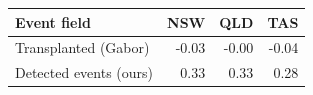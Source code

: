 \begin{tabular}{lrrr}
\toprule
Event field & NSW & QLD & TAS \\
\midrule
Transplanted (Gabor) & -0.03 & -0.00 & -0.04 \\
Detected events (ours) & 0.33 & 0.33 & 0.28 \\
\bottomrule
\end{tabular}
